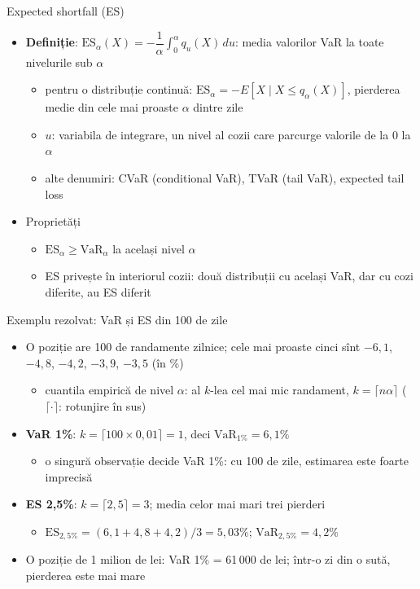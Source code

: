 \begin{frame}{Expected shortfall (ES)}
\itemsize{\small}
\begin{itemize}
    \item \textbf{Definiție}: $\mathrm{ES}_\alpha(X) = -\dfrac{1}{\alpha}\displaystyle\int_0^\alpha q_u(X)\,du$: media valorilor VaR la toate nivelurile sub $\alpha$
    \begin{itemize}
        \item pentru o distribuție continuă: $\mathrm{ES}_\alpha = -E[X \mid X \le q_\alpha(X)]$, pierderea medie din cele mai proaste $\alpha$ dintre zile
        \item $u$: variabila de integrare, un nivel al cozii care parcurge valorile de la 0 la $\alpha$
        \item alte denumiri: CVaR (conditional VaR), TVaR (tail VaR), expected tail loss
    \end{itemize}
    \item Proprietăți
    \begin{itemize}
        \item $\mathrm{ES}_\alpha \ge \mathrm{VaR}_\alpha$ la același nivel $\alpha$
        \item ES privește în interiorul cozii: două distribuții cu același VaR, dar cu cozi diferite, au ES diferit
    \end{itemize}
\end{itemize}
\end{frame}

\begin{frame}{Exemplu rezolvat: VaR și ES din 100 de zile}
\itemsize{\small}
\begin{itemize}
    \item O poziție are 100 de randamente zilnice; cele mai proaste cinci sînt $-6{,}1$, $-4{,}8$, $-4{,}2$, $-3{,}9$, $-3{,}5$ (în \%)
    \begin{itemize}
        \item cuantila empirică de nivel $\alpha$: al $k$-lea cel mai mic randament, $k = \lceil n\alpha \rceil$ ($\lceil\cdot\rceil$: rotunjire în sus)
    \end{itemize}
    \item \textbf{VaR 1\%}: $k = \lceil 100 \times 0{,}01 \rceil = 1$, deci $\mathrm{VaR}_{1\%} = 6{,}1\%$
    \begin{itemize}
        \item o singură observație decide VaR 1\%: cu 100 de zile, estimarea este foarte imprecisă
    \end{itemize}
    \item \textbf{ES 2,5\%}: $k = \lceil 2{,}5 \rceil = 3$; media celor mai mari trei pierderi
    \begin{itemize}
        \item $\mathrm{ES}_{2{,}5\%} = (6{,}1 + 4{,}8 + 4{,}2)/3 = 5{,}03\%$; $\mathrm{VaR}_{2{,}5\%} = 4{,}2\%$
    \end{itemize}
    \item O poziție de 1 milion de lei: VaR 1\% = 61\,000 de lei; într-o zi din o sută, pierderea este mai mare
\end{itemize}
\end{frame}

